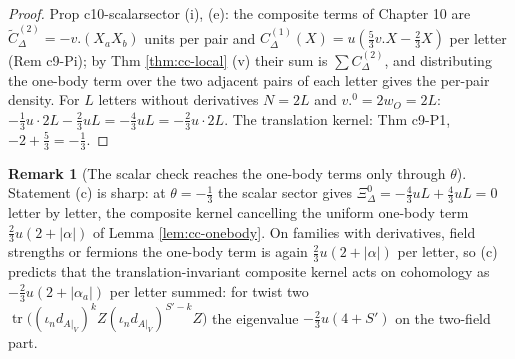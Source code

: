 \documentclass[11pt]{article}
\numberwithin{equation}{section}
\theoremstyle{plain}
\theoremstyle{definition}
\newtheorem{remark}[theorem]{Remark}
\newcommand{\AV}{A|_V}
\begin{document}
\begin{proof}
Prop c10-scalarsector (i), (e): the composite terms of Chapter 10 are $\widetilde C^{(2)}_\Delta=-v.(X_aX_b)$ units per pair and $C^{(1)}_\Delta(X)=u(\tfrac53v.X-\tfrac23X)$ per letter (Rem c9-Pi); by Thm \ref{thm:cc-local} (v) their sum is $\sum C^{(2)}_\Delta$, and distributing the one-body term over the two adjacent pairs of each letter gives the per-pair density. For $L$ letters without derivatives $N=2L$ and $v.^0=2w_O=2L$: $-\tfrac13u\cdot2L-\tfrac23uL=-\tfrac43uL=-\tfrac23u\cdot2L$. The translation kernel: Thm c9-P1, $-2+\tfrac53=-\tfrac13$.
\end{proof}

\begin{remark}[The scalar check reaches the one-body terms only through $\theta$]
\label{rem:cc-scalarcheck}
Statement (c) is sharp: at $\theta=-\tfrac13$ the scalar sector gives $\Xi^0_\Delta=-\tfrac43uL+\tfrac43uL=0$ letter by letter, the composite kernel cancelling the uniform one-body term $\tfrac23u(2+|\alpha|)$ of Lemma \ref{lem:cc-onebody}. On families with derivatives, field strengths or fermions the one-body term is again $\tfrac23u(2+|\alpha|)$ per letter, so (c) predicts that the translation-invariant composite kernel acts on cohomology as $-\tfrac23u(2+|\alpha_a|)$ per letter summed: for twist two $\operatorname{tr}\big((\iota_nd_{\AV})^kZ(\iota_nd_{\AV})^{S'-k}Z\big)$ the eigenvalue $-\tfrac23u(4+S')$ on the two-field part.
\end{remark}
\end{document}
